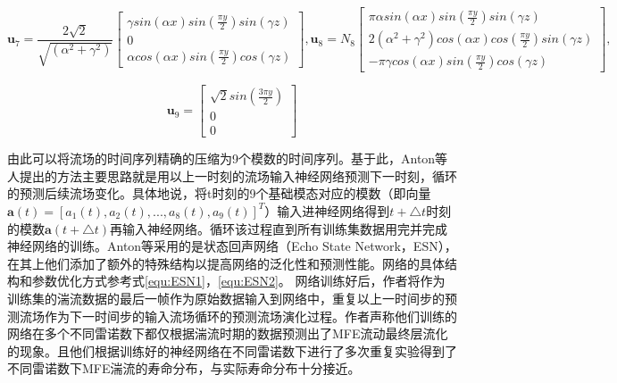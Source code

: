 $$
\bm u_7 = \frac{2\sqrt{2}}{\sqrt{(\alpha^2+\gamma^2)}}
\begin{bmatrix}
\gamma sin(\alpha x)sin(\frac{\pi y}{2})sin(\gamma z)\\
0\\
\alpha cos(\alpha x)sin(\frac{\pi y}{2})cos(\gamma z)
\end{bmatrix},
\bm u_8 = N_8
\begin{bmatrix}
\pi\alpha sin(\alpha x)sin(\frac{\pi y}{2})sin(\gamma z)\\
2(\alpha^2+\gamma^2)cos(\alpha x)cos(\frac{\pi y}{2})sin(\gamma z)\\
-\pi\gamma cos(\alpha x)sin(\frac{\pi y}{2})cos(\gamma z)
\end{bmatrix},
$$

$$
\bm u_9 = 
\begin{bmatrix}
\sqrt{2}sin(\frac{3\pi y}{2})\\
0\\
0
\end{bmatrix}
$$

由此可以将流场的时间序列精确的压缩为9个模数的时间序列。基于此，Anton等人提出的方法主要思路就是用以上一时刻的流场输入神经网络预测下一时刻，循环的预测后续流场变化。具体地说，将t时刻的9个基础模态对应的模数（即向量$ \bm a(t) =  [a_1(t),a_2(t),...,a_8(t),a_9(t)]^{T}$）输入进神经网络得到$t + \triangle t$时刻的模数$ \bm a(t + \triangle t)$再输入神经网络。循环该过程直到所有训练集数据用完并完成神经网络的训练。Anton等采用的是状态回声网络（Echo State Network，ESN），在其上他们添加了额外的特殊结构以提高网络的泛化性和预测性能。网络的具体结构和参数优化方式参考式\ref{equ:ESN1}，\ref{equ:ESN2}。
网络训练好后，作者将作为训练集的湍流数据的最后一帧作为原始数据输入到网络中，重复以上一时间步的预测流场作为下一时间步的输入流场循环的预测流场演化过程。作者声称他们训练的网络在多个不同雷诺数下都仅根据湍流时期的数据预测出了MFE流动最终层流化的现象。且他们根据训练好的神经网络在不同雷诺数下进行了多次重复实验得到了不同雷诺数下MFE湍流的寿命分布，与实际寿命分布十分接近。

